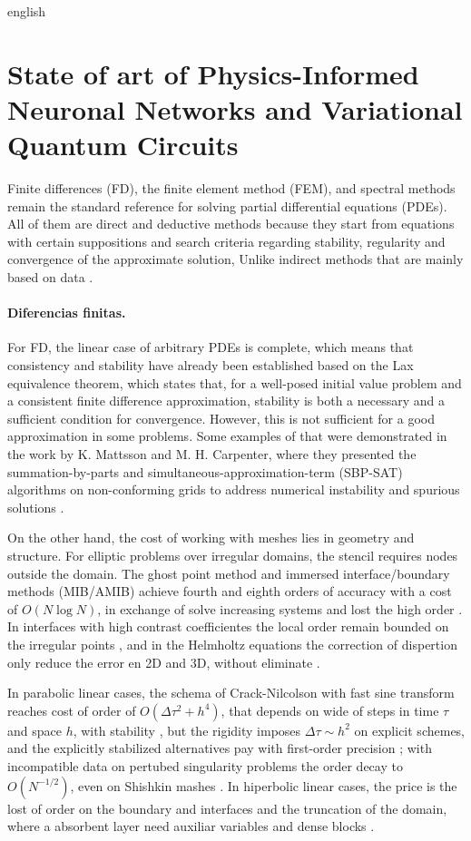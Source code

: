 \documentclass[../0000.tex]{subfiles}
\begin{document}
\begin{hyphenrules}{english}
\section{State of art of Physics-Informed Neuronal Networks and Variational Quantum Circuits}

Finite differences (FD), the finite element method (FEM), and spectral methods remain the standard reference for solving partial differential equations (PDEs). All of them 
are direct and deductive methods because they start from equations with certain suppositions and search criteria regarding stability, regularity and convergence of the 
approximate solution, Unlike indirect methods that are mainly based on data \cite{nooraiepour2026partial,thomee2001finite}.

\paragraph{Diferencias finitas.}
For FD, the linear case of arbitrary PDEs is complete, which means that consistency and stability have already been established based on the Lax equivalence 
theorem, which states that, for a well-posed initial value problem and a consistent finite difference approximation, stability is both a necessary and a sufficient 
condition for convergence. However, this is not sufficient for a good approximation in some problems. Some examples of that were demonstrated in the work by K. Mattsson 
and M. H. Carpenter, where they presented the summation-by-parts and simultaneous-approximation-term (SBP-SAT) algorithms on non-conforming grids to address 
numerical instability and spurious solutions \cite{leveque2007finite,svard2014review}. 

On the other hand, the cost of working with meshes lies in geometry and structure. For elliptic problems over irregular domains, the stencil requires nodes outside the domain. The ghost point method and immersed interface/boundary 
methods (MIB/AMIB) achieve fourth and eighth orders of accuracy with a cost of $O(N\log N)$, in exchange of solve increasing systems and lost the high order 
\cite{ren2022fft,coco2024high}. In interfaces with high contrast coefficientes the local order remain bounded on the irregular points \cite{feng2022high}, and 
in the Helmholtz equations the correction of dispertion only reduce the error en 2D and 3D, without eliminate \cite{cocquet2024asymptotic}. 

In parabolic linear cases, the schema of Crack-Nilcolson with fast sine transform reaches cost of order of $O(\Delta \tau^2+h^4)$, that depends on wide of steps in time 
$\tau$ and space $h$, with stability \cite{li2023fast}, but the rigidity imposes $\Delta \tau \sim h^2$ on explicit schemes, and the explicitly stabilized alternatives 
pay with first-order precision \cite{abdulle2022explicit}; with incompatible data on pertubed singularity problems the order decay to $O(N^{-1/2})$, even on Shishkin 
mashes \cite{gracia2023singularly}. In hiperbolic linear cases, the price is the lost of order on the boundary and interfaces \cite{wang2022energy} and the truncation 
of the domain, where a absorbent layer need auxiliar variables and dense blocks \cite{hojas2024reflectionless}. 


\end{hyphenrules}
\end{document}
